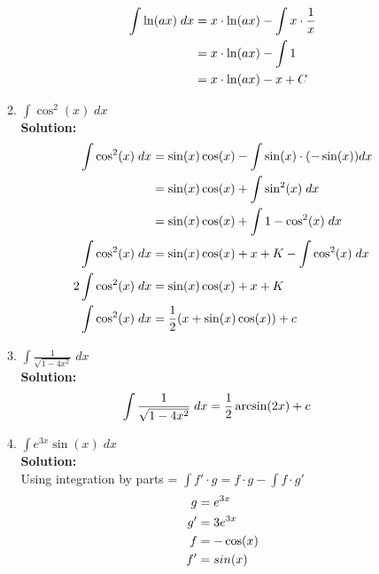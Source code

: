 \documentclass[a4paper]{article}
\begin{document}
\begin{enumerate}
\begin{enumerate}
	
\begin{align}
	\int \ln(ax) \; dx &= x \cdot \ln(ax) - \int x \cdot \frac{1}{x}\notag\\
	&= x \cdot \ln(ax) - \int 1\notag\\
	&= x \cdot \ln(ax) - x + C\notag
\end{align}		
	
	\item $\int \cos^2(x) \; dx$\\
	\textbf{Solution:}\\

\begin{align}
	\int \cos^2(x) \; dx &= \sin(x)\cos(x) - \int \sin(x) \cdot (-\sin(x))dx\notag\\
	&= \sin(x)\cos(x) + \int \sin^2(x) \; dx\notag\\
	&= \sin(x)\cos(x) + \int 1 - \cos^2(x) \; dx\notag\\
	\int \cos^2(x) \; dx &= \sin(x)\cos(x) + x + K - \int \cos^2(x) \; dx\notag\\
	2 \int \cos^2(x) \; dx &= \sin(x)\cos(x) + x + K\notag\\
	\int \cos^2(x) \; dx &= \frac{1}{2}(x + \sin(x)\cos(x)) + c\notag 
\end{align}	
	
	\item $\int \frac{1}{\sqrt{1 - 4x^2}} \; dx$\\
	\textbf{Solution:}\\

\begin{align}
	\int \frac{1}{\sqrt{1 - 4x^2}} \; dx &= \frac{1}{2} \arcsin(2x) + c\notag
\end{align}	

	\item $\int e^{3x}\sin(x) \; dx$\\
	\textbf{Solution:}\\


Using integration by parts = $\int f' \cdot g = f \cdot g - \int f \cdot g'$\\	


\begin{align}
	g &= e^{3x}\notag\\
	g' &= 3e^{3x}\notag\\
	f &= -\cos(x)\notag\\
	f' &= sin(x)\notag
\end{align}	



\end{enumerate}
\end{enumerate}
\end{document}
